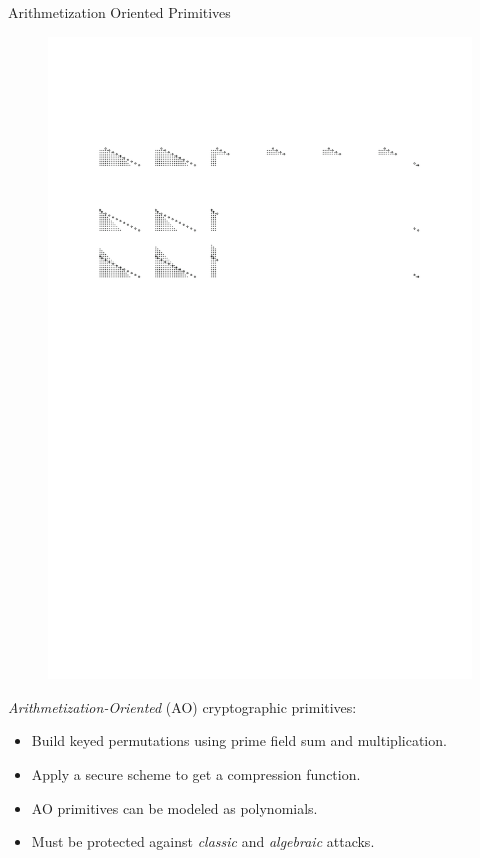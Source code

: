 \documentclass[beamer={10pt,xcolor=dvipsnames},target=mst]{thud}
\begin{document}
\begin{frame}{Arithmetization Oriented Primitives}
  \begin{figure}
    \centering
    \includegraphics[scale=1.0]{res/HoevenL2019.pdf}
  \end{figure}
  \emph{Arithmetization-Oriented} (AO) cryptographic primitives:
  \begin{itemize}
    \item Build keyed permutations using prime field sum and multiplication.
    \item Apply a secure scheme to get a compression function.
    \item AO primitives can be modeled as polynomials.
    \item Must be protected against \emph{classic} and \emph{algebraic} attacks.
  \end{itemize}
\end{frame}
\end{document}
